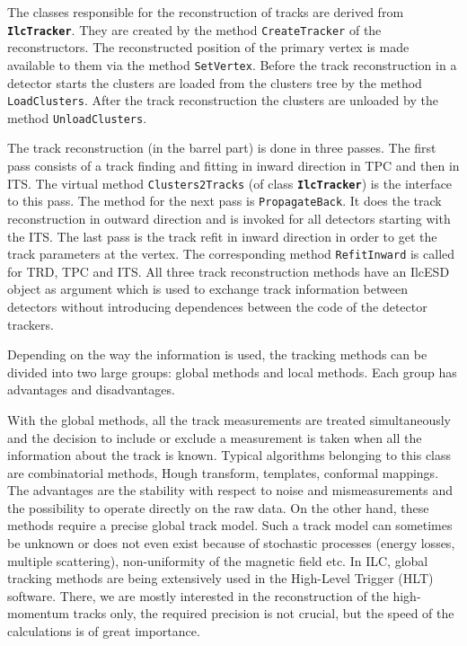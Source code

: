 \documentclass[12pt,a4paper,twoside]{article}
\newcommand{\class}[1]{\texttt{\textbf{#1}}\xspace}
\newcommand{\method}[1]{\texttt{#1}\xspace}
\begin{document}
The classes responsible for the reconstruction of tracks are derived
from \class{IlcTracker}. They are created by the method
\method{CreateTracker} of the 
reconstructors. The reconstructed position of the primary vertex is
made available to them via the method \method{SetVertex}. Before the track
reconstruction in a detector starts the clusters are loaded from the
clusters tree by the method \method{LoadClusters}. After the track reconstruction the
clusters are unloaded by the method \method{UnloadClusters}.

The track reconstruction (in the barrel part) is done in three passes. The first
pass consists of a track finding and fitting in inward direction in
TPC and then in ITS. The virtual method \method{Clusters2Tracks} (of
class \class{IlcTracker}) is the
interface to this pass. The method for the next pass is
\method{PropagateBack}. It does the track reconstruction in outward direction and is
invoked for all detectors starting with the ITS. The last pass is the
track refit in inward direction in order to get the track parameters
at the vertex. The corresponding method \method{RefitInward} is called for TRD,
TPC and ITS. All three track reconstruction methods have an IlcESD object as
argument which is used to exchange track information between detectors
without introducing dependences between the code of the detector
trackers. 

Depending on the way the information is used, the tracking methods can be 
divided into two large groups: global methods and local methods. Each 
group has advantages and disadvantages.

With the global methods, all the track measurements are treated 
simultaneously and the decision to include or exclude a measurement is
taken when all the information about the track is known.
Typical algorithms belonging to this class are combinatorial methods,
Hough transform, templates, conformal mappings.  The advantages are
the stability with respect to noise and mismeasurements and the possibility 
to operate directly on the raw data. On the other hand, these methods
require a precise global track model. Such a track model can sometimes be 
unknown or does not even exist because of stochastic processes (energy
losses, multiple scattering), non-uniformity of the magnetic field etc.
In ILC, global tracking methods are being extensively used in the
High-Level Trigger (HLT) software. There, we
are mostly interested in the reconstruction of the high-momentum tracks
only, the required precision is not crucial, but the speed of the 
calculations is of great importance.
\end{document}
